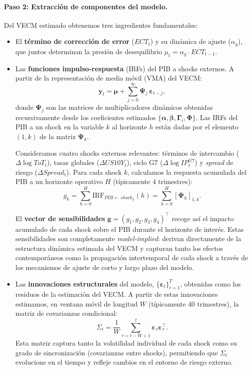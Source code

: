 \documentclass[11pt,a4paper]{article}
\numberwithin{equation}{section}
\newcommand{\vect}[1]{\boldsymbol{#1}}
\begin{document}
\paragraph{Paso 2: Extracción de componentes del modelo.}
Del VECM estimado obtenemos tres ingredientes fundamentales:
\begin{itemize}[nosep]
  \item El \textbf{término de corrección de error} ($ECT_t$) y su dinámica de ajuste ($\alpha_y$), que juntos determinan la presión de desequilibrio $\mu_t = \alpha_y \cdot ECT_{t-1}$.
  
  \item Las \textbf{funciones impulso-respuesta} (IRFs) del PIB a shocks externos. A partir de la representación de media móvil (VMA) del VECM:
  $$
  \vect{y}_t = \vect{\mu} + \sum_{j=0}^{\infty}\vect{\Psi}_j\,\vect{\varepsilon}_{t-j},
  $$
  donde $\vect{\Psi}_j$ son las matrices de multiplicadores dinámicos obtenidas recursivamente desde los coeficientes estimados $\{\vect{\alpha}, \vect{\beta}, \vect{\Gamma}_i, \vect{\Phi}\}$. Las IRFs del PIB a un shock en la variable $k$ al horizonte $h$ están dadas por el elemento $(1,k)$ de la matriz $\vect{\Psi}_h$. 
  
  Consideramos cuatro shocks externos relevantes: términos de intercambio ($\Delta \log ToT_t$), tasas globales ($\Delta US10Y_t$), ciclo G7 ($\Delta \log IP^{G7}_t$) y \emph{spread} de riesgo ($\Delta Spread_t$). Para cada shock $k$, calculamos la respuesta acumulada del PIB a un horizonte operativo $H$ (típicamente 4 trimestres):
  $$
  g_k = \sum_{h=0}^{H} \text{IRF}_{PIB \leftarrow shock_k}(h) = \sum_{h=0}^{H} [\vect{\Psi}_h]_{1,k}.
  $$
  
  El \textbf{vector de sensibilidades} $\vect{g} = (g_1, g_2, g_3, g_4)^{\top}$ recoge así el impacto acumulado de cada shock sobre el PIB durante el horizonte de interés. Estas sensibilidades son completamente \textit{model-implied}: derivan directamente de la estructura dinámica estimada del VECM y capturan tanto los efectos contemporáneos como la propagación intertemporal de cada shock a través de los mecanismos de ajuste de corto y largo plazo del modelo.
  
  \item Las \textbf{innovaciones estructurales} del modelo, $\{\vect{\varepsilon}_t\}_{t=1}^{T}$, obtenidas como los residuos de la estimación del VECM. A partir de estas innovaciones estimamos, en ventana móvil de longitud $W$ (típicamente 40 trimestres), la matriz de covarianzas condicional:
  $$
  \Sigma_t = \frac{1}{W}\sum_{\tau=t-W+1}^{t}\vect{\varepsilon}_{\tau}\vect{\varepsilon}_{\tau}^{\top}.
  $$
  Esta matriz captura tanto la volatilidad individual de cada shock como su grado de sincronización (covarianzas entre shocks), permitiendo que $\Sigma_t$ evolucione en el tiempo y refleje cambios en el entorno de riesgo externo.
\end{itemize}
\end{document}

